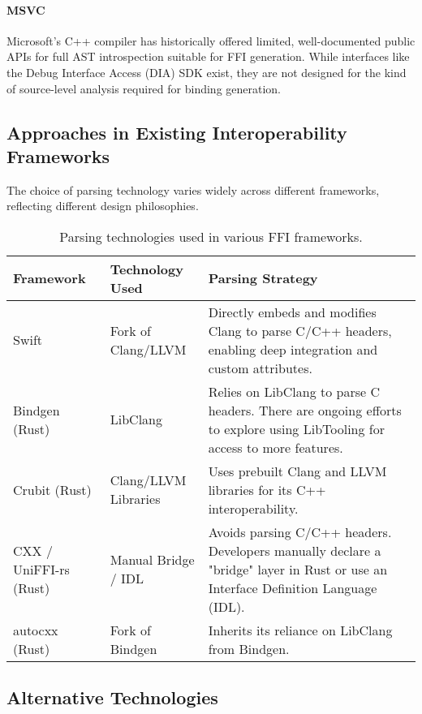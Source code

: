 \paragraph{MSVC}
Microsoft's C++ compiler has historically offered limited, well-documented public APIs for full AST introspection suitable for FFI generation. While interfaces like the Debug Interface Access (DIA) SDK exist, they are not designed for the kind of source-level analysis required for binding generation.

\subsection{Approaches in Existing Interoperability Frameworks}

The choice of parsing technology varies widely across different frameworks, reflecting different design philosophies.

\begin{table}[h!]
\centering
\begin{tabular}{p{} p{} p{}}
\hline
\textbf{Framework} & \textbf{Technology Used} & \textbf{Parsing Strategy} \\
\hline
Swift & Fork of Clang/LLVM & Directly embeds and modifies Clang to parse C/C++ headers, enabling deep integration and custom attributes. \\
Bindgen (Rust) & LibClang & Relies on LibClang to parse C headers. There are ongoing efforts to explore using LibTooling for access to more features. \\
Crubit (Rust) & Clang/LLVM Libraries & Uses prebuilt Clang and LLVM libraries for its C++ interoperability. \\
CXX / UniFFI-rs (Rust) & Manual Bridge / IDL & Avoids parsing C/C++ headers. Developers manually declare a "bridge" layer in Rust or use an Interface Definition Language (IDL). \\
autocxx (Rust) & Fork of Bindgen & Inherits its reliance on LibClang from Bindgen. \\
\hline
\end{tabular}
\caption{Parsing technologies used in various FFI frameworks.}
\label{tab:ffi_parsing_tech}
\end{table}

\subsection{Alternative Technologies}

